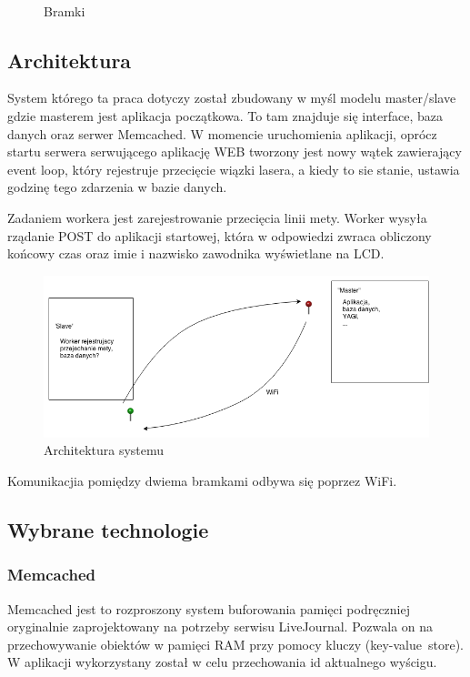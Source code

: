 \documentclass[11pt,a4paper, twoside]{article}
\begin{document}
\begin{figure}[H]
\begin{center}
\caption{Bramki}
$\label{both}$
\end{center}
\end{figure}
\newpage
\subsection{Architektura}
System którego ta praca dotyczy został zbudowany w myśl modelu master/slave gdzie masterem jest aplikacja początkowa. To tam znajduje się interface, baza danych oraz serwer Memcached. W momencie uruchomienia aplikacji, oprócz startu serwera serwującego aplikację WEB tworzony jest nowy wątek zawierający event loop, który rejestruje przecięcie wiązki lasera, a kiedy to sie stanie, ustawia godzinę tego zdarzenia w bazie danych.

Zadaniem workera jest zarejestrowanie przecięcia linii mety. Worker wysyła rządanie POST do aplikacji startowej, która w odpowiedzi zwraca obliczony końcowy czas oraz imie i nazwisko zawodnika wyświetlane na LCD.
\newline

\begin{figure}[ht]
\includegraphics[scale=0.5]{./img/asdasd.png}
\caption{Architektura systemu}
\end{figure}
\noindent
Komunikacjia pomiędzy dwiema bramkami odbywa się poprzez WiFi.
\subsection{Wybrane technologie}
\subsubsection{Memcached}
Memcached jest to rozproszony system buforowania pamięci podręczniej oryginalnie zaprojektowany na potrzeby serwisu  LiveJournal. Pozwala on na przechowywanie obiektów w pamięci RAM przy pomocy kluczy \mbox{(key-value store)}. W aplikacji wykorzystany został w celu przechowania id aktualnego wyścigu.
\end{document}
